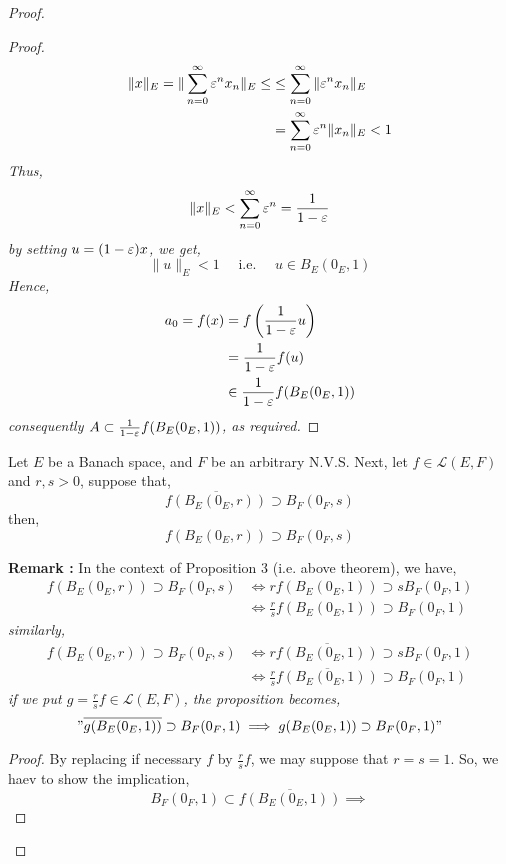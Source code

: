 \begin{proof}
\begin{proof}
\begin{align*}
\| x \| _{E} =  \| \sum_{n=0}^{\infty}  \varepsilon ^n x_{n} \| _{E} 
\leq  & \leq  \sum_{n=0}^{\infty}  \| \varepsilon ^n  x_{n} \| _{E} \\
      & = \sum_{n=0}^{\infty}  \varepsilon ^n  \| x_{n} \|  _{E} 
      < 1
\end{align*}
\it Thus,  \normalfont
\[
\| x \| _{E} <  
\sum_{n=0}^{\infty}  \varepsilon ^n  = \frac{1}{1-\varepsilon }
\]
by setting $u = (1 - \varepsilon )x  $, we get, 
\[
\| u \| _{E} <  1 \quad \text{ i.e. }  \quad 
u \in  B_{E} (0_{E}, 1) 
\]
Hence,
\begin{align*}
	a_0 = f(x)  &= 
	f \left( \frac{1}{1-\varepsilon }u \right) \\ 
		    &= \frac{1}{1- \varepsilon } 
		    f(u) \\
		    & \in \frac{1}{1-\varepsilon } f(B_{E}(0_{E},1) )  
\end{align*}
consequently $A \subset \frac{1}{1-\varepsilon } f(B_{E}(0_{E},1) ) $, as required.
\end{proof}
\begin{theorem}[]
Let $E $ be a Banach space, and $F $ be an arbitrary N.V.S. Next, 
let $f \in  \mathcal{L} (E,F)  $  and $r, s > 0 $, suppose that, 
\[
\overline{f \left( B_{E}(0_{E},r)  \right)} \supset 
B_{F}(0_{F}, s) 
\]
then, 
\[
f(B_{E}(0_{E},r) )  \supset B_{F}(0_{F},s) 
\]
\end{theorem}
\textbf{Remark :} In the context of Proposition $3$ (i.e. above theorem), 
we have, 
\begin{align*}
	f (B_{E}(0_{E},r) )  \supset B_{F}(0_{F}, s)  &\iff 
	r f(B_{E}(0_{E},1) )  \supset s B_{F}(0_{F},1)  \\
						      & \iff 
	\frac{r}{s} f(B_{E} (0_{E},1) )  \supset 
	B_{F}(0_{F},1)
\end{align*}
\it similarly,  \normalfont
\begin{align*}
	f (B_{E}(0_{E},r) )   \supset  B_{F}(0_{F}, s)
	& \iff  
	r\overline{f(B_{E}(0_{E},1) ) } \supset  
	s B_{F}(0_{F},1)  \\
	& \iff 
	\frac{r}{s} \overline{f(B_{E}(0_{E},1) ) } 
	\supset B_{F}(0_{F},1)  
\end{align*}
if we put $g = \frac{r}{s} f \in  \mathcal{L} (E,F) $, the proposition
becomes, 
\[
"\overline{g(B_{E}(0_{E},1) )}  \supset 
B_{F}(0_{F}, 1)  \implies 
g(B_{E}(0_{E},1) )  \supset 
B_{F}(0_{F}, 1)"
\]
\begin{proof}
By replacing if necessary $f $ by $ \frac{r}{s} f$,
we may suppose that $r = s = 1 $. So, we haev to show the implication, 
\[
B_{F}(0_{F}, 1)  \subset \overline{f(B_{E}(0_{E},1) ) } \implies 
\]
\end{proof}
\end{proof}
